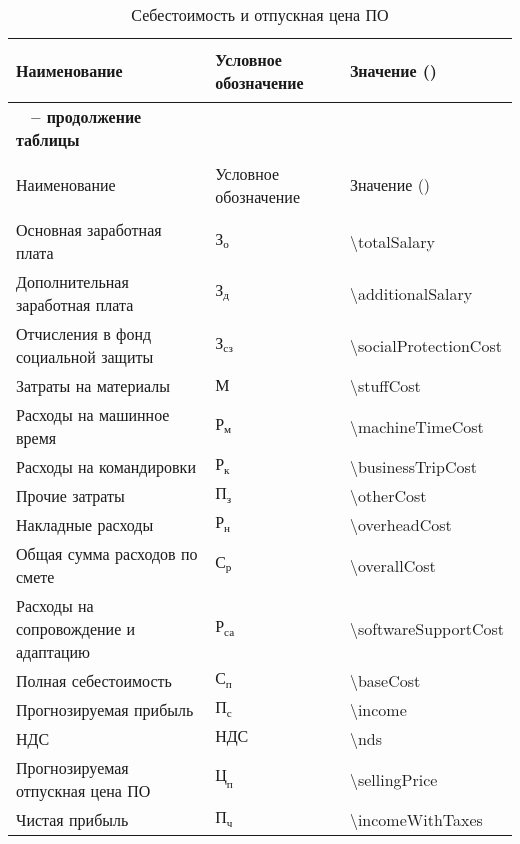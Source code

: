 \begin{longtable}{| >{\raggedright}m{}
                  | >{\centering}m{}
                  | >{\centering\arraybackslash}m{}|}
\caption{Себестоимость и отпускная цена ПО}
\label{table:econ:selfprice} \\

\hline
{\begin{center}
  Наименование
\end{center} } & Условное обозначение & Значение (\byr{}) \\
\endfirsthead

\multicolumn{3}{c}%
{{\bfseries \tablename\ \thetable{} -- продолжение таблицы}} \\
\hline
{\begin{center}
  Наименование
\end{center} } & Условное обозначение & Значение (\byr{}) \\
\endhead

\hline
Основная заработная плата & $\text{З}_{\text{о}}$ & \num{\totalSalary} \\
\hline
Дополнительная заработная плата & $\text{З}_{\text{д}}$ & \num{\additionalSalary} \\
\hline
Отчисления в фонд социальной защиты & $\text{З}_{\text{сз}}$ &\num{\socialProtectionCost} \\
\hline
Затраты на материалы & $\text{М}$ &\num{\stuffCost} \\
\hline
Расходы на машинное время & $\text{Р}_{\text{м}}$ &\num{\machineTimeCost} \\
\hline
Расходы на командировки & $\text{Р}_{\text{к}}$ &\num{\businessTripCost} \\
\hline
Прочие затраты & $\text{П}_{\text{з}}$ &\num{\otherCost} \\
\hline
Накладные расходы & $\text{Р}_{\text{н}}$ &\num{\overheadCost} \\
\hline
Общая сумма расходов по смете & $\text{С}_{\text{р}}$ &\num{\overallCost} \\
\hline
Расходы на сопровождение и адаптацию & $\text{Р}_{\text{са}}$ &\num{\softwareSupportCost} \\
\hline
Полная себестоимость & $\text{С}_{\text{п}}$ &\num{\baseCost} \\
\hline
Прогнозируемая прибыль & $\text{П}_{\text{с}}$ &\num{\income} \\
\hline
НДС & $\text{НДС}$ &\num{\nds} \\
\hline
Прогнозируемая отпускная цена ПО & $\text{Ц}_{\text{п}}$ &\num{\sellingPrice} \\
\hline
Чистая прибыль & $\text{П}_{\text{ч}}$ &\num{\incomeWithTaxes} \\
\hline
\end{longtable}
\hfill

